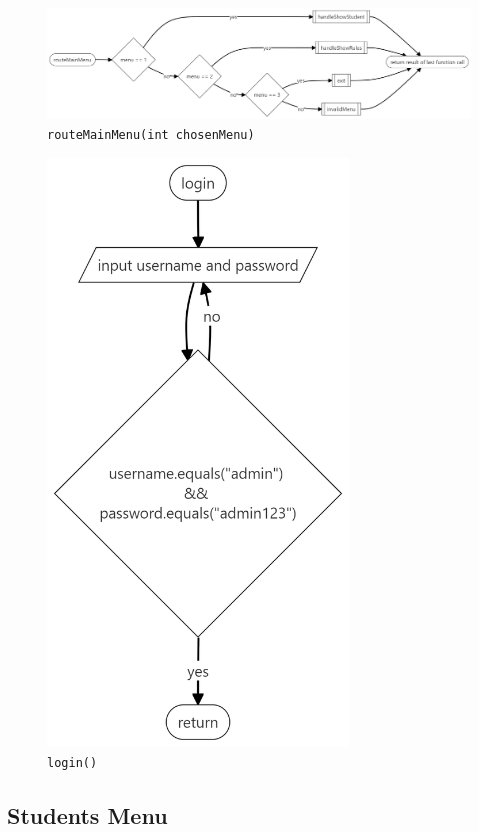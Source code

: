 \documentclass[12pt,titlepage]{article}
\begin{document}
\begin{figure}[h]
    \centering
    \includegraphics[width=.9\textwidth]{flowcharts/route-main-menu.png}
    \caption{\texttt{routeMainMenu(int chosenMenu)}}
\end{figure}

\pagebreak

\begin{figure}[h]
    \centering
    \includegraphics[width=8cm]{flowcharts/login.png}
    \caption{\texttt{login()}}
\end{figure}

\pagebreak

\subsection{Students Menu}
\end{document}

